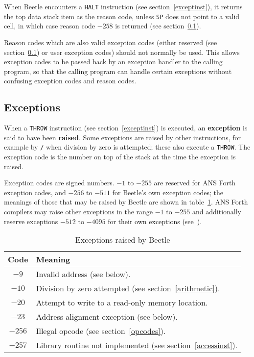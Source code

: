 \documentclass{article}
\begin{document}
When Beetle encounters a {\tt HALT} instruction (see section~\ref{exceptinst}),
it returns the top data stack item as the reason code, unless {\tt SP} does not
point to a valid cell, in which case reason code $-258$ is returned (see section~\ref{exceptions}).

Reason codes which are also valid exception codes (either reserved (see section~\ref{exceptions})
or user exception codes) should not normally be used. This
allows exception codes to be passed back by an exception handler to the calling
program, so that the calling program can handle certain exceptions without
confusing exception codes and reason codes.


\subsection{Exceptions}
\label{exceptions}

When a {\tt THROW} instruction (see section~\ref{exceptinst}) is executed, an
{\bf exception} is said to have been {\bf raised}. Some exceptions are raised by
other instructions, for example by {\tt /} when division by zero is attempted;
these also execute a {\tt THROW}. The exception code is the number on top of the
stack at the time the exception is raised.

Exception codes are signed numbers. $-1$ to $-255$ are reserved for ANS Forth
exception codes, and $-256$ to $-511$ for Beetle's own exception codes; the meanings
of those that may be raised by Beetle are shown in table~\ref{excepttable}. ANS
Forth compilers may raise other exceptions in the range $-1$ to $-255$ and
additionally reserve exceptions $-512$ to $-4095$ for their own exceptions
(see~\cite[section 9.3.1]{ANSIforth}).

\begin{table}[htbp]
\begin{center}
\begin{tabular}{cl} \toprule
\bf Code & \bf Meaning \\ \midrule
$-9$ & Invalid address (see below). \\
$-10$ & Division by zero attempted (see section~\ref{arithmetic}). \\
$-20$ & Attempt to write to a read-only memory location. \\
$-23$ & Address alignment exception (see below). \\
$-256$ & Illegal opcode (see section~\ref{opcodes}). \\
$-257$ & Library routine not implemented (see section~\ref{accessinst}). \\ \bottomrule
\end{tabular}
\caption{\label{excepttable}Exceptions raised by Beetle}
\end{center}
\end{table}
\end{document}
